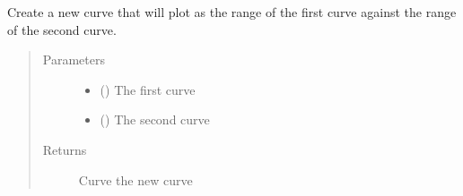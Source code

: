 \documentclass[letterpaper,10pt,english]{sphinxmanual}
\begin{document}
\begin{fulllineitems}
\label{\detokenize{pydv:pydvpy.vs}}
Create a new curve that will plot as the range of the first curve against
the range of the second curve.

\begin{sphinxVerbatim}[commandchars=\\\{\}]
  
\end{sphinxVerbatim}

\begin{sphinxVerbatim}[commandchars=\\\{\}]
  \PYG{p}{[}\PYG{p}{]} \PYG{p}{[}\PYG{p}{]}
\end{sphinxVerbatim}

\begin{sphinxVerbatim}[commandchars=\\\{\}]
\end{sphinxVerbatim}

\begin{sphinxVerbatim}[commandchars=\\\{\}]
 
\end{sphinxVerbatim}
\begin{quote}\begin{description}
\item[{Parameters}] \leavevmode\begin{itemize}
\item {} 
 ({\hyperref[\detokenize{pydv:curve.Curve}]{}}) \textendash{} The first curve

\item {} 
 ({\hyperref[\detokenize{pydv:curve.Curve}]{}}) \textendash{} The second curve

\end{itemize}

\item[{Returns}] \leavevmode
Curve \textendash{} the new curve

\end{description}\end{quote}

\end{fulllineitems}
\end{document}
